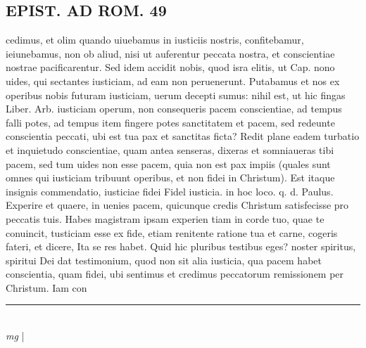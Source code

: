 \documentclass{article}
\begin{document}
\begin{pages}
\section*{EPIST. AD ROM.  49 }
\marginpar{[ p.]}\pstart cedimus, et olim quando uiuebamus in iusticiis nostris, confitebamur, ieiunebamus, non ob aliud, nisi ut auferentur peccata nostra, et conscientiae nostrae pacificarentur. Sed idem accidit nobis, quod isra elitis, ut Cap. nono uides, qui sectantes iusticiam, ad eam non peruenerunt. Putabamus et nos ex operibus nobis futuram iusticiam, uerum decepti sumus: nihil est, ut hic fingas Liber. Arb. iusticiam operum, non consequeris pacem conscientiae, ad tempus falli potes, ad tempus item fingere potes sanctitatem et pacem, sed redeunte conscientia peccati, ubi est tua pax et sanctitas ficta? Redit plane eadem turbatio et inquietudo conscientiae, quam antea senseras, dixeras et somniaueras tibi pacem, sed tum uides non esse pacem, quia non est pax impiis (quales sunt omnes qui iusticiam tribuunt operibus, et non fidei in Christum). Est itaque insignis commendatio, iusticiae fidei Fidel iusticia.  in hoc loco. q. d. Paulus. Experire et quaere, in uenies pacem, quicunque credis Christum satisfecisse pro peccatis tuis. Habes magistram ipsam experien tiam in corde tuo, quae te conuincit, tusticiam esse ex fide, etiam renitente ratione tua et carne, cogeris fateri, et dicere, Ita se res habet. Quid hic pluribus testibus eges? noster spiritus, spiritui Dei dat testimonium, quod non sit alia iusticia, qua pacem habet conscientia, quam fidei, ubi sentimus et credimus peccatorum remissionem per Christum. Iam con\pend
\vspace{0.5cm}\noindent
\vspace{0.2cm}\rule{1cm}{0.2pt}\\ 
\hspace{0.2cm}\textit{mg}
\footnotesize 
\normalsize| 

\end{pages}
\end{document}
